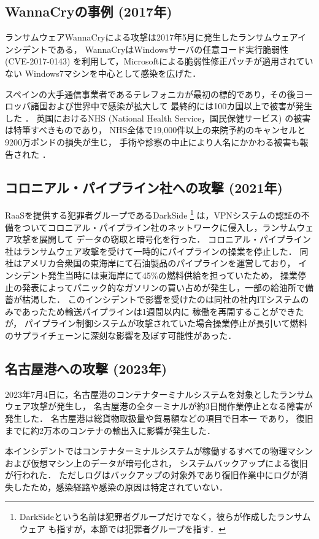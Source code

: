 \subsection{WannaCryの事例 (2017年)}
ランサムウェアWannaCryによる攻撃は2017年5月に発生したランサムウェアインシデントである，
WannaCryはWindowsサーバの任意コード実行脆弱性 (CVE-2017-0143) を利用して，Microsoftによる脆弱性修正パッチが適用されていない
Windows7マシンを中心として感染を広げた．

スペインの大手通信事業者であるテレフォニカが最初の標的であり，その後ヨーロッパ諸国および世界中で感染が拡大して
最終的には100カ国以上で被害が発生した \cite{wannacry-attack}．
英国におけるNHS (National Health Service，国民保健サービス) の被害は特筆すべきものであり，
NHS全体で19,000件以上の来院予約のキャンセルと9200万ポンドの損失が生じ，
手術や診察の中止により人名にかかわる被害も報告された \cite{kaspersky-wannacry}．

\subsection{コロニアル・パイプライン社への攻撃 (2021年)}
RaaSを提供する犯罪者グループであるDarkSide \footnote{DarkSideという名前は犯罪者グループだけでなく，彼らが作成したランサムウェア \cite{DarkSide42:online}
  も指すが，本節では犯罪者グループを指す．}
は，VPNシステムの認証の不備をついてコロニアル・パイプライン社のネットワークに侵入し，ランサムウェア攻撃を展開して
データの窃取と暗号化を行った\cite{colonial-pipeline-attack}．
コロニアル・パイプライン社はランサムウェア攻撃を受けて一時的にパイプラインの操業を停止した．
同社はアメリカ合衆国の東海岸にて石油製品のパイプラインを運営しており，
インシデント発生当時には東海岸にて45\%の燃料供給を担っていたため，
操業停止の発表によってパニック的なガソリンの買い占めが発生し，一部の給油所で備蓄が枯渇した．
このインシデントで影響を受けたのは同社の社内ITシステムのみであったため輸送パイプラインは1週間以内に
稼働を再開することができたが，
パイプライン制御システムが攻撃されていた場合操業停止が長引いて燃料のサプライチェーンに深刻な影響を及ぼす可能性があった．

\subsection{名古屋港への攻撃 (2023年)}
2023年7月4日に，名古屋港のコンテナターミナルシステムを対象としたランサムウェア攻撃が発生し，
名古屋港の全ターミナルが約3日間作業停止となる障害が発生した\cite{nagoya-port-attack}．
名古屋港は総貨物取扱量や貿易額などの項目で日本一 \cite{nagoya-port-no1} であり，
復旧までに約2万本のコンテナの輸出入に影響が発生した．

本インシデントではコンテナターミナルシステムが稼働するすべての物理マシンおよび仮想マシン上のデータが暗号化され，
システムバックアップによる復旧が行われた．
ただしログはバックアップの対象外であり復旧作業中にログが消失したため，感染経路や感染の原因は特定されていない．

